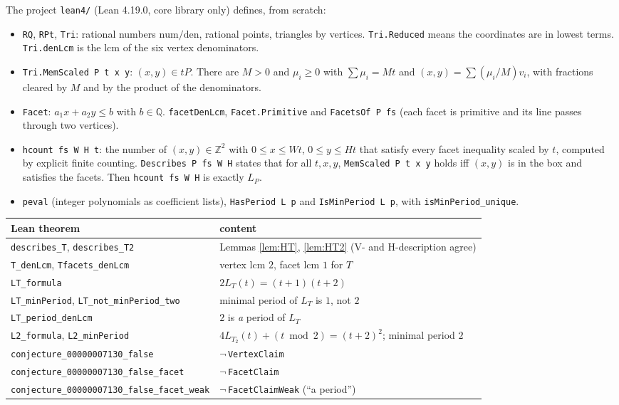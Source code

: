 \documentclass[11pt]{article}
\theoremstyle{definition}
\theoremstyle{remark}
\newcommand{\Z}{\mathbb Z}
\newcommand{\Q}{\mathbb Q}
\begin{document}
The project \texttt{lean4/} (Lean 4.19.0, core library only) defines, from scratch:
\begin{itemize}
\item \texttt{RQ}, \texttt{RPt}, \texttt{Tri}: rational numbers $\mathrm{num}/\mathrm{den}$, rational
points, triangles by vertices. \texttt{Tri.Reduced} means the coordinates are in lowest terms.
\texttt{Tri.denLcm} is the lcm of the six vertex denominators.
\item \texttt{Tri.MemScaled P t x y}: $(x,y)\in tP$. There are $M>0$ and $\mu_i\ge0$ with
$\sum\mu_i=Mt$ and $(x,y)=\sum(\mu_i/M)v_i$, with fractions cleared by $M$ and by the product of the
denominators.
\item \texttt{Facet}: $a_1x+a_2y\le b$ with $b\in\Q$. \texttt{facetDenLcm}, \texttt{Facet.Primitive}
and \texttt{FacetsOf P fs} (each facet is primitive and its line passes through two vertices).
\item \texttt{hcount fs W H t}: the number of $(x,y)\in\Z^2$ with $0\le x\le Wt$, $0\le y\le Ht$ that
satisfy every facet inequality scaled by $t$, computed by explicit finite counting.
\texttt{Describes P fs W H} states that for all $t,x,y$, \texttt{MemScaled P t x y} holds iff
$(x,y)$ is in the box and satisfies the facets. Then \texttt{hcount fs W H} is exactly
$L_P$.
\item \texttt{peval} (integer polynomials as coefficient lists), \texttt{HasPeriod L p} and
\texttt{IsMinPeriod L p}, with \texttt{isMinPeriod\_unique}.
\end{itemize}

\begin{center}
\begin{tabular}{@{}ll@{}}
\toprule
Lean theorem & content\\
\midrule
\texttt{describes\_T}, \texttt{describes\_T2} & Lemmas \ref{lem:HT}, \ref{lem:HT2} (V- and H-description agree)\\
\texttt{T\_denLcm}, \texttt{Tfacets\_denLcm} & vertex lcm $2$, facet lcm $1$ for $T$\\
\texttt{LT\_formula} & $2L_T(t)=(t+1)(t+2)$\\
\texttt{LT\_minPeriod}, \texttt{LT\_not\_minPeriod\_two} & minimal period of $L_T$ is $1$, not $2$\\
\texttt{LT\_period\_denLcm} & $2$ is \emph{a} period of $L_T$\\
\texttt{L2\_formula}, \texttt{L2\_minPeriod} & $4L_{T_2}(t)+(t\bmod2)=(t+2)^2$; minimal period $2$\\
\texttt{conjecture\_00000007130\_false} & $\neg$\,\texttt{VertexClaim}\\
\texttt{conjecture\_00000007130\_false\_facet} & $\neg$\,\texttt{FacetClaim}\\
\texttt{conjecture\_00000007130\_false\_facet\_weak} & $\neg$\,\texttt{FacetClaimWeak} (``a period'')\\
\bottomrule
\end{tabular}
\end{center}
\end{document}
